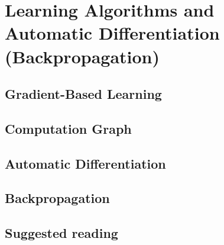 \renewcommand{\prevpart}{3 }
\renewcommand{\thispart}{4 }
\renewcommand{\nextpart}{5 }

\section{Learning Algorithms and Automatic Differentiation (Backpropagation)}





% 
\subsection{Gradient-Based Learning}

\subsection{Computation Graph}



\subsection{Automatic Differentiation}







\subsection{Backpropagation}

\subsection{Suggested reading}

